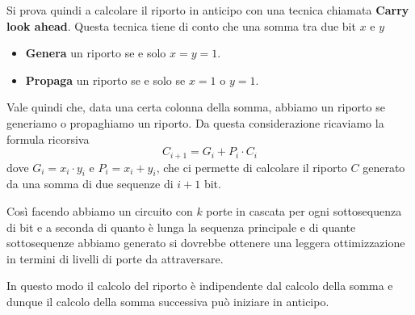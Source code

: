 Si prova quindi a calcolare il riporto in anticipo con una tecnica chiamata \textbf{Carry look ahead}.
Questa tecnica tiene di conto che una somma tra due bit $x$ e $y$
\begin{itemize}
	\item \textbf{Genera} un riporto se e solo $x = y = 1$.
	\item \textbf{Propaga} un riporto se e solo se $x = 1$ o $y = 1$.
\end{itemize}
Vale quindi che, data una certa colonna della somma, abbiamo un riporto se generiamo o propaghiamo
un riporto. Da questa considerazione ricaviamo la formula ricorsiva
\[ C_{i+1} = G_i + P_i \cdot C_i \]
dove $G_i = x_i \cdot y_i$ e $P_i = x_i + y_i$, che ci permette di calcolare il riporto $C$
generato da una somma di due sequenze di $i+1$ bit.

Così facendo abbiamo un circuito con $k$ porte in cascata per ogni sottosequenza di bit e a seconda
di quanto è lunga la sequenza principale e di quante sottosequenze abbiamo generato si dovrebbe
ottenere una leggera ottimizzazione in termini di livelli di porte da attraversare.

In questo modo il calcolo del riporto è indipendente dal calcolo della somma e dunque il calcolo
della somma successiva può iniziare in anticipo.

